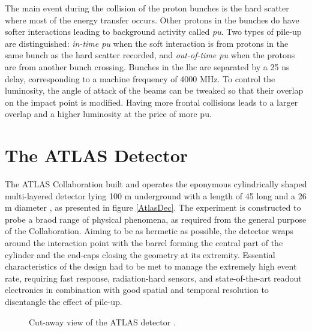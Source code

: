 The main event during the collision of the proton bunches is the hard scatter where most of the energy transfer occurs. Other protons in the bunches do have softer interactions leading to background activity called \textit{\gls{pu}}. Two types of pile-up are distinguished: \textit{in-time \gls{pu}} when the soft interaction is from protons in the same bunch as the hard scatter recorded, and \textit{out-of-time \gls{pu}} when the protons are from another bunch crossing. Bunches in the \gls{lhc} are separated by a 25 ns delay, corresponding to a machine frequency of 4000 MHz. To control the luminosity, the angle of attack of the beams can be tweaked so that their overlap on the impact point is modified. Having more frontal collisions leads to a larger overlap and  a higher luminosity at the price of more \gls{pu}. 

\section{The ATLAS Detector}\label{sec-ATLASDet}
The ATLAS Collaboration built and operates the eponymous cylindrically shaped multi-layered detector lying 100 m underground with a length of 45 long and a 26 m diameter \cite{TheATLASCollaboration_2008}, as presented in figure \ref{AtlasDec}. The experiment is constructed to probe a braod range of physical phenomena, as required from the general purpose of the Collaboration. Aiming to be as hermetic as possible, the detector wraps around the interaction point with the barrel forming the central part of the cylinder and the end-caps closing the geometry at its extremity. Essential characteristics of the design had to be met to manage the extremely high event rate, requiring fast response, radiation-hard sensors, and state-of-the-art readout electronics in combination with good spatial and temporal resolution to disentangle the effect of pile-up. 

\begin{figure}[!h]
\centering
\hspace{-1.25cm}
\caption{Cut-away view of the ATLAS detector \cite{ATLASschematics}.}
\label{fig-AtlasDec}
\end{figure}

